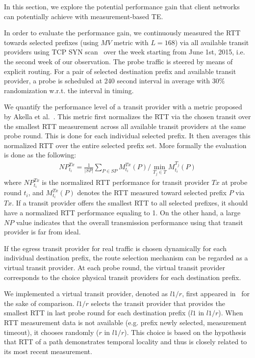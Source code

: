 In this section, we explore the potential performance gain that client networks can potentially achieve with measurement-based TE.

In order to evaluate the performance gain, we continuously measured the \acf{RTT} towards selected prefixes (using $MV$ metric with $L=168$) via all available transit providers using TCP SYN scan~\cite{nmap} over the week starting from June 1st, 2015, i.e. the second week of our observation.
The probe traffic is steered by means of explicit routing.
For a pair of selected destination prefix and available transit provider, a probe is scheduled at 240 second interval in average with $30\%$ randomization w.r.t. the interval in timing. 

We quantify the performance level of a transit provider with a metric proposed by Akella et al.\ \cite{Akella2003a}. 
This metric first normalizes the RTT via the chosen transit over the smallest RTT  measurement across all available transit providers at the same probe round. This is done for each individual selected prefix.
It then averages this normalized RTT over the entire selected prefix set.
More formally the evaluation is done as the following:
\begin{align*}
NP^{Tx}_{t_i} = \frac{1}{|SP|} \sum_{P \in SP} M^{Tx}_{t_i}(P)/\min_{T_j \in T}M^{T_j}_{t_i}(P)
\label{eq:np}
\end{align*}
where $NP^{Tx}_{t_i}$ is the normalized RTT performance for transit provider $Tx$ at probe round $t_i$, and 
$M^{Tx}_{t_i}(P)$ denotes the RTT measured toward selected prefix $P$ via $Tx$.
If a transit provider offers the smallest RTT to all selected prefixes, it should have a normalized RTT performance equaling to 1. 
On the other hand, a large $NP$ value indicates that the overall transmission performance using that transit provider is far from ideal.

If the egress transit provider for real traffic is chosen dynamically for each individual destination prefix, the route selection mechanism can be regarded as a virtual transit provider. 
At each probe round, the virtual transit provider corresponds to the choice physical transit providers for each destination prefix. 

We implemented a virtual transit provider, denoted as $l1/r$, first appeared in~\cite{Akella2008} for the sake of comparison. 
$l1/r$ selects the transit provider that provides the smallest RTT in last probe round for each destination prefix ($l1$ in $l1/r$). 
When RTT measurement data is not available (e.g. prefix newly selected, measurement timeout), it chooses randomly ($r$ in $l1/r$). 
This choice is based on the hypothesis that RTT of a path demonstrates temporal locality and thus is closely related to its most recent measurement.

